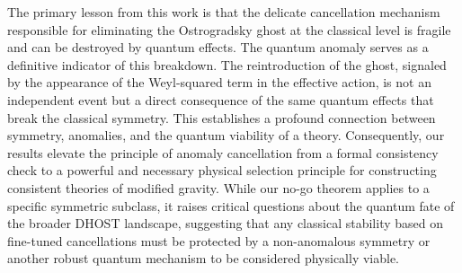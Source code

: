 \documentclass[twocolumn]{aastex631}
\begin{document}
The primary lesson from this work is that the delicate cancellation mechanism responsible for eliminating the Ostrogradsky ghost at the classical level is fragile and can be destroyed by quantum effects. The quantum anomaly serves as a definitive indicator of this breakdown. The reintroduction of the ghost, signaled by the appearance of the Weyl-squared term in the effective action, is not an independent event but a direct consequence of the same quantum effects that break the classical symmetry. This establishes a profound connection between symmetry, anomalies, and the quantum viability of a theory. Consequently, our results elevate the principle of anomaly cancellation from a formal consistency check to a powerful and necessary physical selection principle for constructing consistent theories of modified gravity. While our no-go theorem applies to a specific symmetric subclass, it raises critical questions about the quantum fate of the broader DHOST landscape, suggesting that any classical stability based on fine-tuned cancellations must be protected by a non-anomalous symmetry or another robust quantum mechanism to be considered physically viable.
\end{document}
